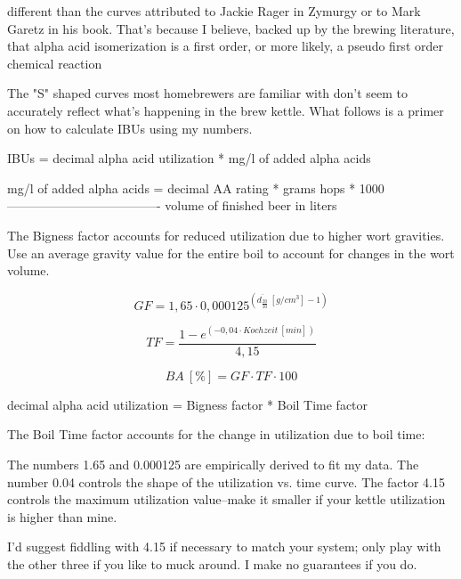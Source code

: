 \documentclass[a4paper,parskip=half]{scrartcl}
\begin{document}
different than the curves attributed to Jackie Rager in Zymurgy or to Mark Garetz in his book. That's because I believe, backed up by the brewing literature, that alpha acid isomerization is a first order, or more likely, a pseudo first order chemical reaction

The "S" shaped curves most homebrewers are familiar with don't seem to accurately reflect what's happening in the brew kettle. What follows is a primer on how to calculate IBUs using my numbers.

IBUs = decimal alpha acid utilization * mg/l of added alpha acids

mg/l of added alpha acids = decimal AA rating * grams hops * 1000
                            -------------------------------------
                              volume of finished beer in liters
                              



The Bigness factor accounts for reduced utilization due to higher wort gravities. Use an average gravity value for the entire boil to account for changes in the wort volume.

\begin{equation}
\mathit{GF} = 1,65 \cdot 0,000125^{\left( \overline{d_{\frac{20}{20}}}\:[g/cm^3] - 1 \right)}
\label{eq:tinsethgf}
\end{equation}

\begin{equation}
\mathit{TF} = \frac{1 - e^{\left( -0,04 \cdot \mathit{Kochzeit}\:[min] \right)}}{4,15}
\label{eq:tinsethtf}
\end{equation}

\begin{equation}
\mathit{BA\:[\%]} = \mathit{GF} \cdot \mathit{TF} \cdot 100
\label{eq:tinsethutil}
\end{equation}

decimal alpha acid utilization = Bigness factor * Boil Time factor

The Boil Time factor accounts for the change in utilization due to boil time:


The numbers 1.65 and 0.000125 are empirically derived to fit my data. The number 0.04 controls the shape of the utilization vs. time curve. The factor 4.15 controls the maximum utilization value--make it smaller if your kettle utilization is higher than mine.

I'd suggest fiddling with 4.15 if necessary to match your system; only play with the other three if you like to muck around. I make no guarantees if you do.
                              
\end{document}
